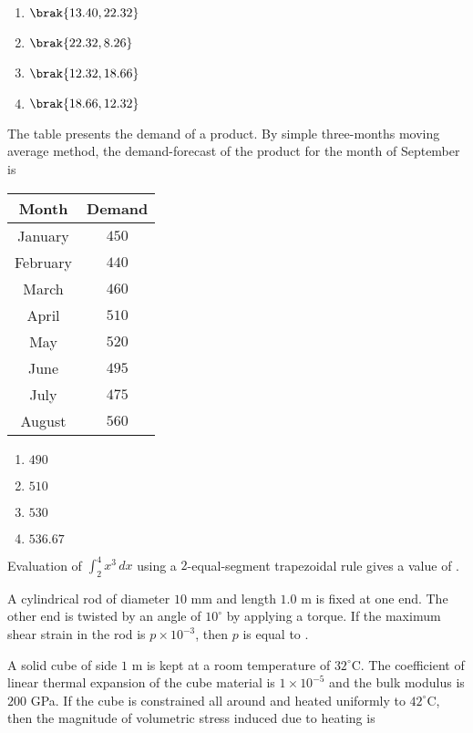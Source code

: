 \begin{enumerate}
    \item $\brak{13.40, 22.32}$
    \item $\brak{22.32, 8.26}$
    \item $\brak{12.32, 18.66}$
    \item $\brak{18.66, 12.32}$
\end{enumerate}

\item The table presents the demand of a product. By simple three-months moving average method, the demand-forecast of the product for the month of September is

\begin{center}
\begin{tabular}{|c|c|}
\hline
\textbf{Month} & \textbf{Demand} \\
\hline
January & $450$ \\
February & $440$ \\
March & $460$ \\
April & $510$ \\
May & $520$ \\
June & $495$ \\
July & $475$ \\
August & $560$ \\
\hline
\end{tabular}
\end{center}

\begin{enumerate}
    \item $490$
    \item $510$
    \item $530$
    \item $536.67$
\end{enumerate}

\item Evaluation of $\int_{2}^{4} x^3 \, dx$ using a $2$-equal-segment trapezoidal rule gives a value of .

\item A cylindrical rod of diameter $10$ mm and length $1.0$ m is fixed at one end. The other end is twisted by an angle of $10^\circ$ by applying a torque. If the maximum shear strain in the rod is $p \times 10^{-3}$, then $p$ is equal to .
    
\item A solid cube of side $1$ m is kept at a room temperature of $32^\circ$C. The coefficient of linear thermal expansion of the cube material is $1 \times 10^{-5} $ and the bulk modulus is $200$ GPa. If the cube is constrained all around and heated uniformly to $42^\circ$C, then the magnitude of volumetric stress induced due to heating is 
    
